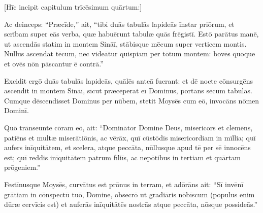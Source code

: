 

\thispagestyle{empty}

[Hīc incipit capitulum trīcēsimum quārtum:]

Ac deinceps:
``Præcīde,'' ait, ``tibi duās tabulās lapideās īnstar priōrum, et
scrībam super eās verba, quæ habuērunt tabulæ quās frēgistī. 
Estō parātus
manē, ut ascendās statim in montem Sināī, stābisque mēcum super
verticem montis. 
Nūllus
ascendat tēcum, nec videātur quispiam per tōtum montem:
bovēs quoque et ovēs nōn pāscantur ē contrā.''

Excidit ergō
duās tabulās lapideās, quālēs anteā fuerant: et dē nocte
cōnsurgēns ascendit in montem Sināī, sīcut
præcēperat eī Dominus, portāns sēcum tabulās. 
Cum\-que dēscendisset Dominus per nūbem, stetit Moysēs cum
eō, invocāns nōmen Dominī. 

Quō trānseunte cōram eō, ait: ``Dominātor
Domine Deus, misericors et clēmēns, patiēns et multæ
miserātiōnis, ac vērāx, 
quī cūstōdīs
misericordiam in mīllia; quī aufers inīquitātem, et
scelera, atque peccāta, nūllusque
apud tē per sē innocēns est; quī reddis inīquitātem patrum
fīliīs, ac nepōtibus in tertiam et quārtam
prōgeniem.''

Festīnusque Moysēs, curvātus est prōnus in terram, et
adōrāns 
ait: ``Sī invēnī grātiam in cōnspectū tuō, Domine,
obsecrō ut gradiāris nōbīscum (populus enim
dūræ cervīcis est)
et auferās inīquitātēs nostrās atque peccāta, nōsque possideās.''

